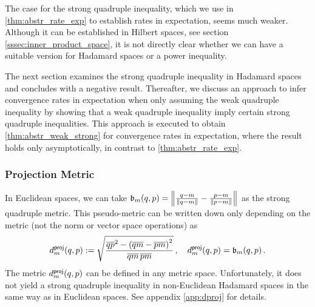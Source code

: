 The case for the strong quadruple inequality, which we use in \autoref{thm:abstr_rate_exp} to establish rates in expectation, seems much weaker. 
Although it can be established in Hilbert spaces, see section \ref{sssec:inner_product_space}, it is not directly clear whether we can have a suitable version for Hadamard spaces or a power inequality. 

The next section examines the strong quadruple inequality in Hadamard spaces and concludes with a negative result. Thereafter, we discuss an approach to infer convergence rates in expectation when only assuming the weak quadruple inequality by showing that a weak quadruple inequality imply certain strong quadruple inequalities. This approach is executed to obtain \autoref{thm:abstr_weak_strong} for convergence rates in expectation, where the result holds only asymptotically, in contrast to \autoref{thm:abstr_rate_exp}.
%
%
\subsubsection{Projection Metric}
%
In Euclidean spaces, we can take $\mathfrak{b}_m(q,p) = \left\Vert \frac{q-m}{\Vert q-m \Vert}-\frac{p-m}{\Vert p-m \Vert} \right\Vert$ as the strong quadruple metric. This pseudo-metric can be written down only depending on the metric (not the norm or vector space operations) as
\begin{equation*}
	d_{m}^{\mathsf{proj}}(q,p) := \sqrt{\frac{\overline{qp}^2 - \left( \overline{qm} - \overline{pm} \right)^2}{\overline{qm}\, \overline{pm}}}\, ,\quad  d_{m}^{\mathsf{proj}}(q,p) = \mathfrak{b}_m(q,p)
	\, .
\end{equation*} 
%
The metric $d_{m}^{\mathsf{proj}}(q,p)$ can be defined in any metric space. Unfortunately, it does not yield a strong quadruple inequality in non-Euclidean Hadamard spaces in the same way as in Euclidean spaces. See appendix \autoref{app:dproj} for details.
%
%
